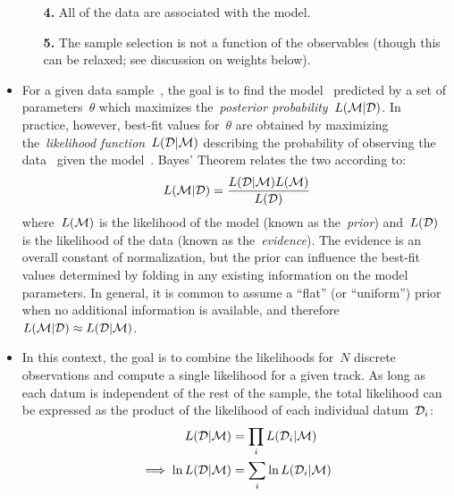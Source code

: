 \documentclass[ms.tex]{subfiles}
\begin{document}
\begin{itemize}
\begin{itemize}
		\item[\textbf{4.}] All of the data are associated with the model.

		\item[\textbf{5.}] The sample selection is not a function of the
		observables (though this can be relaxed; see discussion on weights
		below).

	\end{itemize}

	\item For a given data sample~, the goal is to find the
	model~ predicted by a set of parameters~$\theta$ which maximizes
	the~\textit{posterior probability}~$L(\mathcal{M} | \mathcal{D})$.
	In practice, however, best-fit values for~$\theta$ are obtained by
	maximizing the~\textit{likelihood function}~$L(\mathcal{D} | \mathcal{M})$
	describing the probability of observing the data~ given the
	model~.
	Bayes' Theorem relates the two according to:
	\begin{equation}
	\label{eq:bayes_theorem}
	L(\mathcal{M} | \mathcal{D}) = \frac{
		L(\mathcal{D} | \mathcal{M}) L(\mathcal{M})
	}{
		L(\mathcal{D})
	}
	\end{equation}
	where~$L(\mathcal{M})$ is the likelihood of the model (known as
	the~\textit{prior}) and~$L(\mathcal{D})$ is the likelihood of the data
	(known as the~\textit{evidence}).
	The evidence is an overall constant of normalization, but the prior can
	influence the best-fit values determined by folding in any existing
	information on the model parameters.
	In general, it is common to assume a ``flat'' (or ``uniform'') prior when
	no additional information is available, and therefore
	$L(\mathcal{M} | \mathcal{D}) \approx L(\mathcal{D} | \mathcal{M})$.

	\item In this context, the goal is to combine the likelihoods for~$N$
	discrete observations and compute a single likelihood for a given track.
	As long as each datum is independent of the rest of the sample, the total
	likelihood can be expressed as the product of the likelihood of each
	individual datum~$\mathcal{D}_i$:
	\begin{subequations}\begin{align}
	L(\mathcal{D} | \mathcal{M}) &= \prod_i L(\mathcal{D}_i | \mathcal{M})
	\\
	\implies \ln L(\mathcal{D} | \mathcal{M}) &= \sum_i \ln L(\mathcal{D}_i |
	\mathcal{M})
	\label{eq:l_d_m}
	\end{align}\end{subequations}


\end{itemize}
\end{document}
